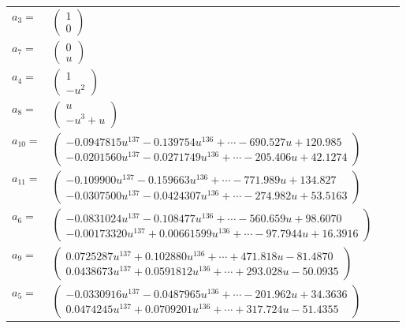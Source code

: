 \documentclass[1p]{elsarticle_modified}
\theoremstyle{definition}
\begin{document}
\begin{tabular}{m{7pt} m{180pt} m{7pt} m{180pt} }
\flushright $a_{3}=$&$\begin{pmatrix}1\\0\end{pmatrix}$ \\
\flushright $a_{7}=$&$\begin{pmatrix}0\\u\end{pmatrix}$ \\
\flushright $a_{4}=$&$\begin{pmatrix}1\\- u^2\end{pmatrix}$ \\
\flushright $a_{8}=$&$\begin{pmatrix}u\\- u^3+u\end{pmatrix}$ \\
\flushright $a_{10}=$&$\begin{pmatrix}-0.0947815 u^{137}-0.139754 u^{136}+\cdots-690.527 u+120.985\\-0.0201560 u^{137}-0.0271749 u^{136}+\cdots-205.406 u+42.1274\end{pmatrix}$ \\
\flushright $a_{11}=$&$\begin{pmatrix}-0.109900 u^{137}-0.159663 u^{136}+\cdots-771.989 u+134.827\\-0.0307500 u^{137}-0.0424307 u^{136}+\cdots-274.982 u+53.5163\end{pmatrix}$ \\
\flushright $a_{6}=$&$\begin{pmatrix}-0.0831024 u^{137}-0.108477 u^{136}+\cdots-560.659 u+98.6070\\-0.00173320 u^{137}+0.00661599 u^{136}+\cdots-97.7944 u+16.3916\end{pmatrix}$ \\
\flushright $a_{9}=$&$\begin{pmatrix}0.0725287 u^{137}+0.102880 u^{136}+\cdots+471.818 u-81.4870\\0.0438673 u^{137}+0.0591812 u^{136}+\cdots+293.028 u-50.0935\end{pmatrix}$ \\
\flushright $a_{5}=$&$\begin{pmatrix}-0.0330916 u^{137}-0.0487965 u^{136}+\cdots-201.962 u+34.3636\\0.0474245 u^{137}+0.0709201 u^{136}+\cdots+317.724 u-51.4355\end{pmatrix}$ \\

\end{tabular}
\end{document}
